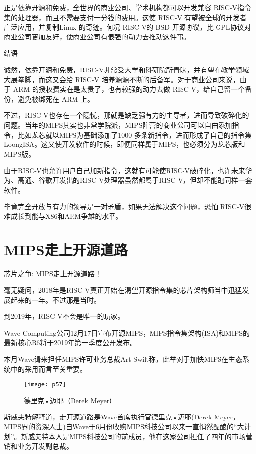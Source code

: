 \documentclass[utf8]{book}
\begin{document}
正是依靠开源和免费，全世界的商业公司、学术机构都可以开发兼容 RISC-V指令集的处理器，而且不需要支付一分钱的费用。这使 RISC-V 有望被全球的开发者广泛应用，并复制Linux 的奇迹。何况 RISC-V的 BSD 开源协议，比 GPL协议对商业公司更加友好，使商业公司有很强的动力去推动这件事。

{\LARGE 结语}

诚然，依靠开源和免费，RISC-V非常受大学和科研院所青睐，并有望在教学领域大展拳脚，而这又会给 RISC-V 培养源源不断的后备军。对于商业公司来说，由于 ARM 的授权费实在是太贵了，也有较强的动力去做 RISC-V，给自己留一个备份，避免被绑死在 ARM 上。

不过，RISC-V也存在一个隐忧，那就是缺乏强有力的主导者，进而导致破碎化的问题。当年的MIPS其实也非常学院派，MIPS阵营的商业公司可以自由添加指令，比如龙芯就以MIPS为基础添加了1000 多条新指令，进而形成了自己的指令集LoongISA。这又使开发软件的时候，即便同样属于MIPS，也必须分为龙芯版和MIPS版。

由于RISC-V也允许用户自己加新指令，这就有可能使RISC-V破碎化，也许未来华为、高通、谷歌开发出的RISC-V处理器虽然都属于RISC-V，但却不能跑同样一套软件。

毕竟完全开放与有力的领导是一对矛盾，如果无法解决这个问题，恐怕 RISC-V很难成长到能与X86和ARM争雄的水平。

\section{MIPS走上开源道路}
\begin{center}
{\LARGE 芯片之争: MIPS走上开源道路！}
\end{center}



毫无疑问，2018年是RISC-V真正开始在渴望开源指令集的芯片架构师当中迅猛发展起来的一年。不过那是当时。

到2019年，RISC-V不会是唯一的玩家。

Wave Computing公司12月17日宣布开源MIPS，MIPS指令集架构(ISA)和MIPS的最新核心R6将于2019年第一季度公开发布。

本月Wave请来担任MIPS许可业务总裁Art Swift称，此举对于加快MIPS在生态系统中的采用而言至关重要。

	\begin{figure}[H]
	\centering
	\texttt{[image: p57]}
	\caption{德里克•迈耶（Derek Meyer）}
	\end{figure}


斯威夫特解释道，走开源道路是Wave首席执行官德里克•迈耶(Derek Meyer，MIPS界的资深人士)自Wave于6月份收购MIPS科技公司以来一直悄然酝酿的“大计划”。斯威夫特本人是MIPS科技公司的前成员，他在这家公司担任了四年的市场营销和业务开发副总裁。
\end{document}
